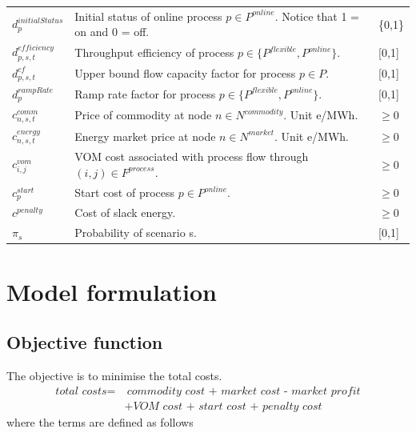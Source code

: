 \documentclass{article}
\begin{document}
\begin{table}[H]
\begin{tabular}{ l |p{8cm}|l  }
$d^{initialStatus}_p$ & Initial status of online process $p \in P^{online}$. Notice that 1 = on and 0 = off. & \{0,1\} \\

$d^{efficiency}_{p, s, t}$ & Throughput efficiency of process $p \in \{P^{flexible}, P^{online}\}$. & [0,1]\\

$d^{cf}_{p,s,t}$ & Upper bound flow capacity factor for process $p \in P$. & [0,1]\\

$d^{rampRate}_{p}$ & Ramp rate factor for process $p \in \{P^{flexible}, P^{online}\}$. & [0,1] \\

 $c^{comm}_{n, s, t}$ & Price of commodity at node $n \in N^{commodity}$. Unit e/MWh.  & $\geq 0$\\
 
 $c^{energy}_{n, s, t}$ & Energy market price at node $n \in N^{market}$. Unit e/MWh. & $\geq 0$ \\
 
 $c^{vom}_{i,j}$  & VOM cost associated with process flow through $(i,j) \in F^{process}$.  & $\geq 0$ \\
 
 $c^{start}_{p}$  & Start cost of process $p \in P^{online}$.  & $\geq 0$ \\
 
 $c^{penalty}$ & Cost of slack energy. & $\geq 0$ \\
 
 $\pi_s$ & Probability of scenario s. & [0,1] \\

\end{tabular}
\end{table}





\section{Model formulation}
\subsection{Objective function}

\noindent The objective is to minimise the total costs. 
\begin{align}
    \textit{total costs} = & \ \textit{commodity cost + market cost - market profit} \nonumber \\
    & + \textit{VOM cost + start cost + penalty cost} \label{eq:total_costs}
\end{align}
where the terms are defined as follows
\end{document}
